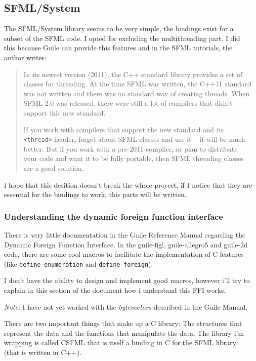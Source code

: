 \documentclass[latterpaper, leqno]{article}
\begin{document}
\subsection{SFML/System}
The SFML/System library seems to be very simple, the bindings exist for a subset of the SFML code. I opted for excluding the multithreading part. I did this because Guile can provide this features and in the SFML tutorials, the author writes:

\begin{quotation}
 In its newest version (2011), the C++ standard library provides a set of classes for threading. At the time SFML was written, the C++11 standard was not written and there was no standard way of creating threads. When SFML 2.0 was released, there were still a lot of compilers that didn't support this new standard.

If you work with compilers that support the new standard and its \texttt{<thread>} header, forget about SFML classes and use it -- it will be much better. But if you work with a pre-2011 compiler, or plan to distribute your code and want it to be fully portable, then SFML threading classes are a good solution. 
\end{quotation}

I hope that this desition doesn't break the whole proyect, if I notice that they are essential for the bindings to work, this parts will be written.

\subsubsection*{Understanding the dynamic foreign function interface}
There is very little documentation in the Guile Reference Manual regarding the Dynamic Foreign Function Interface. In the guile-figl, guile-allegro5 and guile-2d code, there are some cool macros to facilitate the implementation of C features (like \texttt{define-enumeration} and \texttt{define-foreign}).

I don't have the ability to design and implement good macros, however i'll try to explain in this section of the document how i understand this FFI works.

\emph{Note:} I have not yet worked with the \emph{bytevectors} described in the Guile Manual.

\bigskip

There are two important things that make up a C library: The structures that represent the data and the functions that manipulate the data. The library i'm wrapping is called CSFML that is itself a binding in C for the SFML library (that is written in C++).
\end{document}
